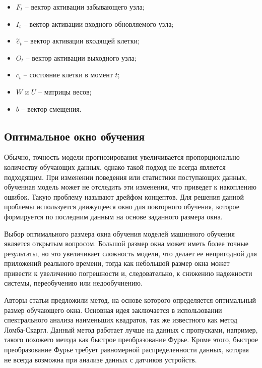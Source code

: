 \newpage

\begin{itemize}
    \item $F_t$ -- вектор активации забывающего узла;
    \item $I_t$ -- вектор активации входного обновляемого узла;
    \item $\stackrel{\sim}{c}_t$ -- вектор активации входящей клетки;
    \item $O_t$ -- вектор активации выходного узла;
    \item $c_t$ -- состояние клетки в момент $t$;
    \item $W$ и $U$ -- матрицы весов;
    \item $b$ -- вектор смещения.
\end{itemize}


\subsection{Оптимальное окно обучения}

Обычно, точность модели прогнозирования увеличивается
пропорционально количеству обучающих данных,
однако такой подход не всегда является подходящим.
При изменении поведения или статистики поступающих данных,
обученная модель может не отследить эти изменения,
что приведет к накоплению ошибок.
Такую проблему называют дрейфом концептов.
Для решения данной проблемы используется
движущееся окно для повторного обучения,
которое формируется по последним данным на основе заданного размера окна.

Выбор оптимального размера окна обучения моделей машинного обучения
является открытым вопросом.
Большой размер окна может иметь более точные результаты,
но это увеличивает сложность модели,
что делает ее непригодной для приложений реального времени,
тогда как небольшой размер окна
может привести к увеличению погрешности и, следовательно,
к снижению надежности системы, переобучению или недообучнению.

Авторы статьи \cite{optimal} предложили метод,
на основе которого определяется оптимальный размер обучающего окна.
Основная идея заключается в использовании 
спектрального анализа наименьших квадратов,
так же известного как метод Ломба-Скаргл.
Данный метод работает лучше на данных с пропусками, например,
такого похожего метода как быстрое преобразование Фурье.
Кроме этого, быстрое преобразование Фурье
требует равномерной распределенности данных,
которая не всегда возможна при анализе данных с датчиков устройств.

